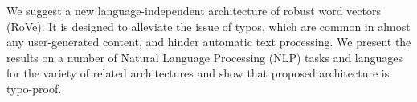 We suggest a new language-independent architecture of robust word vectors (RoVe). It is designed to alleviate the issue of typos, which are common in almost any user-generated content, and hinder automatic text processing. We present the results on a number of Natural Language Processing (NLP) tasks and languages for the variety of related architectures and show that proposed architecture is typo-proof.
